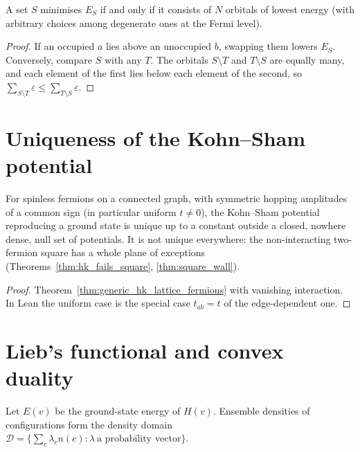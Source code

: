 \begin{theorem}
  \label{thm:aufbau_lowest}
  \leanok
  A set $S$ minimises $E_S$ if and only if it consists of $N$ orbitals of lowest energy (with arbitrary
  choices among degenerate ones at the Fermi level).
\end{theorem}
\begin{proof}
  \leanok
  If an occupied $a$ lies above an unoccupied $b$, swapping them lowers $E_S$. Conversely, compare $S$ with
  any $T$. The orbitals $S\setminus T$ and $T\setminus S$ are equally many, and each element of the first lies
  below each element of the second, so $\sum_{S\setminus T}\varepsilon\le\sum_{T\setminus S}\varepsilon$.
\end{proof}

\section{Uniqueness of the Kohn--Sham potential}

\begin{theorem}
  \label{thm:ks_potential_generic_unique}
  \leanok
  For spinless fermions on a connected graph, with symmetric hopping amplitudes of a common sign (in
  particular uniform $t\ne0$), the Kohn--Sham potential reproducing a ground state is unique up to a
  constant outside a closed, nowhere dense, null set of potentials. It is not unique everywhere: the
  non-interacting two-fermion square has a whole plane of exceptions
  (Theorems~\ref{thm:hk_fails_square}, \ref{thm:square_wall}).
\end{theorem}
\begin{proof}
  \leanok
  Theorem~\ref{thm:generic_hk_lattice_fermions} with vanishing interaction. In Lean the uniform case
  is the special case $t_{ab}=t$ of the edge-dependent one.
\end{proof}

\section{Lieb's functional and convex duality}

Let $E(v)$ be the ground-state energy of $H(v)$. Ensemble densities of configurations form the density domain
$\mathcal{D}=\{\sum_c\lambda_cn(c):\lambda\ \text{a probability vector}\}$.

